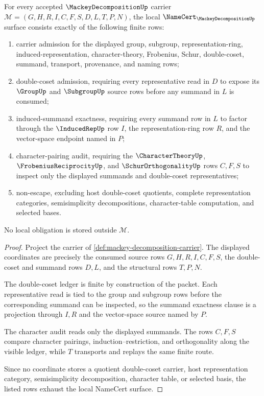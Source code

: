 \begin{theorem}
\label{thm:mackey-decomposition-namecert-obligations}
For every accepted $\MackeyDecompositionUp$ carrier $\mathcal{M}=(G,H,R,I,C,F,S,D,L,T,P,N)$, the local $\NameCert_{\MackeyDecompositionUp}$ surface consists exactly of the following finite rows:
\begin{enumerate}
\item carrier admission for the displayed group, subgroup, representation-ring, induced-representation, character-theory, Frobenius, Schur, double-coset, summand, transport, provenance, and naming rows;
\item double-coset admission, requiring every representative read in $D$ to expose its $\GroupUp$ and $\SubgroupUp$ source rows before any summand in $L$ is consumed;
\item induced-summand exactness, requiring every summand row in $L$ to factor through the $\InducedRepUp$ row $I$, the representation-ring row $R$, and the vector-space endpoint named in $P$;
\item character-pairing audit, requiring the $\CharacterTheoryUp$, $\FrobeniusReciprocityUp$, and $\SchurOrthogonalityUp$ rows $C,F,S$ to inspect only the displayed summands and double-coset representatives;
\item non-escape, excluding host double-coset quotients, complete representation categories, semisimplicity decompositions, character-table computation, and selected bases.
\end{enumerate}
No local obligation is stored outside $\mathcal{M}$.
\end{theorem}
\begin{proof}
Project the carrier of \autoref{def:mackey-decomposition-carrier}. The displayed coordinates are precisely the consumed source rows $G,H,R,I,C,F,S$, the double-coset and summand rows $D,L$, and the structural rows $T,P,N$.

The double-coset ledger is finite by construction of the packet. Each representative read is tied to the group and subgroup rows before the corresponding summand can be inspected, so the summand exactness clause is a projection through $I,R$ and the vector-space source named by $P$.

The character audit reads only the displayed summands. The rows $C,F,S$ compare character pairings, induction--restriction, and orthogonality along the visible ledger, while $T$ transports and replays the same finite route.

Since no coordinate stores a quotient double-coset carrier, host representation category, semisimplicity decomposition, character table, or selected basis, the listed rows exhaust the local NameCert surface.
\end{proof}

